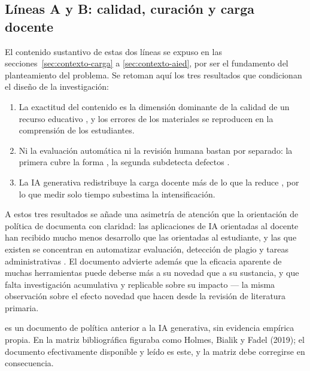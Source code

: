 \subsection{Líneas A y B: calidad, curación y carga docente}
\label{sec:arte-ab}

El contenido sustantivo de estas dos líneas se expuso en las
secciones~\ref{sec:contexto-carga} a \ref{sec:contexto-aied}, por ser el fundamento
del planteamiento del problema. Se retoman aquí los tres resultados que condicionan
el diseño de la investigación:

\begin{enumerate}
  \item La exactitud del contenido es la dimensión dominante de la calidad de un
        recurso educativo \parencite{leacock2007framework}, y los errores de los
        materiales se reproducen en la comprensión de los estudiantes.
  \item Ni la evaluación automática ni la revisión humana bastan por separado: la
        primera cubre la forma \parencite{clements2015open,tabares2017modelo}, la
        segunda subdetecta defectos \parencite{xie2018systematic}.
  \item La IA generativa redistribuye la carga docente más de lo que la reduce
        \parencite{su2026efficiency}, por lo que medir solo tiempo subestima la
        intensificación.
\end{enumerate}

A estos tres resultados se añade una asimetría de atención que la orientación de
política de \textcite{miao2021aieducation} documenta con claridad: las aplicaciones
de IA orientadas al docente han recibido mucho menos desarrollo que las orientadas al
estudiante, y las que existen se concentran en automatizar evaluación, detección de
plagio y tareas administrativas \parencite[p.~18]{miao2021aieducation}. El documento
advierte además que la eficacia aparente de muchas herramientas puede deberse más a
su novedad que a su sustancia, y que falta investigación acumulativa y replicable
sobre su impacto \parencite[p.~26]{miao2021aieducation} --- la misma observación sobre
el efecto novedad que \textcite{zawacki2019systematic} hacen desde la revisión de
literatura primaria.

\begin{advertencia}
\textcite{miao2021aieducation} es un documento de política anterior a la IA
generativa, sin evidencia empírica propia. En la matriz bibliográfica figuraba como
Holmes, Bialik y Fadel (2019); el documento efectivamente disponible y leído es este,
y la matriz debe corregirse en consecuencia.
\end{advertencia}

